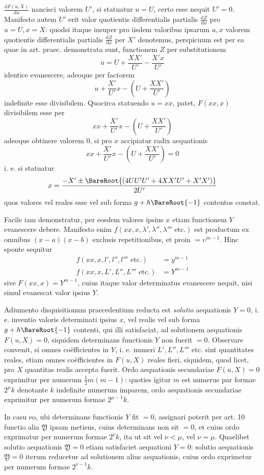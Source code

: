 $\frac{\mathrm dF(u,X)}{\mathrm du}$ nancisci valorem $U'$, si statuatur $u=U$, certo esse nequit $U'=0$. Manifesto autem $U'$ erit valor quotientis differentialis partialis $\frac{\mathrm dZ}{\mathrm du}$ pro $u=U,x=X$:
quodsi itaque insuper pro iisdem valoribus ipsarum $u,x$ valorem quotientis differentialis partialis $\frac{\mathrm dZ}{\mathrm dx}$ per $X'$ denotemus, perspicuum est per ea quae in art.
praec. demonstrata sunt, functionem $Z$ per substitutionem
\[
u=U+\frac{XX'}{U'}-\frac{X'x}{U'}
\]
identice evanescere, adeoque per factorem
\[
u+\frac{X'}{U'}x-(U+\frac{XX'}{U'})
\]
indefinite esse divisibilem. Quocirca statuendo $u=xx$, patet, $F(xx,x)$ divisibilem esse per
\[
xx+\frac{X'}{U'}x-(U+\frac{XX'}{U'})
\]
adeoque obtinere valorem 0, si pro $x$ accipiatur radix aequationis
\[
xx+\frac{X'}{U'}x-(U+\frac{XX'}{U'})=0
\]
i. e. si statuatur
\[
x=\frac{-X'\pm\BareRoot{(4UU'U'+4XX'U'+X'X')}}{2U'}
\]
quos valores vel reales esse vel sub forma $g+h\BareRoot{-1}$ contentos constat.

Facile iam demonstratur, per eosdem valores ipsius $x$ etiam functionem $Y$
evanescere debere. Manifesto enim $f(xx,x,\lambda',\lambda'',\lambda'''\text{ etc.})$ est productum ex omnibus $(x-a)(x-b)$ exclusis repetitionibus, et proin $=\upsilon^{m-1}$. Hinc sponte sequitur
\[
\begin{aligned}
f(xx,x,l',l'',l'''\text{ etc.})&=y^{m-1}\\
f(xx,x,L',L'',L'''\text{ etc.})&=Y^{m-1}
\end{aligned}
\]
sive $F(xx,x)=Y^{m-1}$, cuius itaque valor determinatus evanescere nequit, nisi simul evanescat valor ipsius $Y$.

Adiumento disquisitionum praecedentium reducta est \textit{solutio} aequationis
$Y=0$, i. e. inventio valoris determinati ipsius $x$, vel realis vel sub forma
$g+h\BareRoot{-1}$ contenti, qui illi satisfaciat, ad solutionem aequationis $F(u,X)=0$,
siquidem determinans functionis $Y$ non fuerit $=0$. Observare convenit, si
omnes coëfficientes in $Y$, i. e. numeri $L',L'',L'''$ etc. sint quantitates reales,
etiam omnes coëfficientes in $F(u,X)$ reales fieri, siquidem, quod licet, pro $X$ quantitas realis accepta fuerit. Ordo aequationis secundariae $F(u,X)=0$ exprimitur per numerum $\frac12m(m-1)$: quoties igitur $m$ est numerus par formae $2^\mu k$ denotante $k$ indefinite numerum imparem, ordo aequationis secundariae exprimitur
per numerum formae $2^{\mu-1}k$.

In casu eo, ubi determinans functionis $Y$ fit $=0$, assignari poterit per
art. 10 functio alia $\mathfrak{Y}$ ipsam metiens, cuius determinans non sit $=0$, et cuius
ordo exprimatur per numerum formae $2^\nu k$, ita ut sit vel $\nu<\mu$, vel $\nu=\mu$. Quaelibet solutio aequationis $\mathfrak{Y}=0$ etiam satisfaciet aequationi $Y=0$: solutio aequationis $\mathfrak{Y}=0$ iterum reducetur ad solutionem alius aequationis, cuius ordo
exprimetur per numerum formae $2^{\nu-1}k$.

